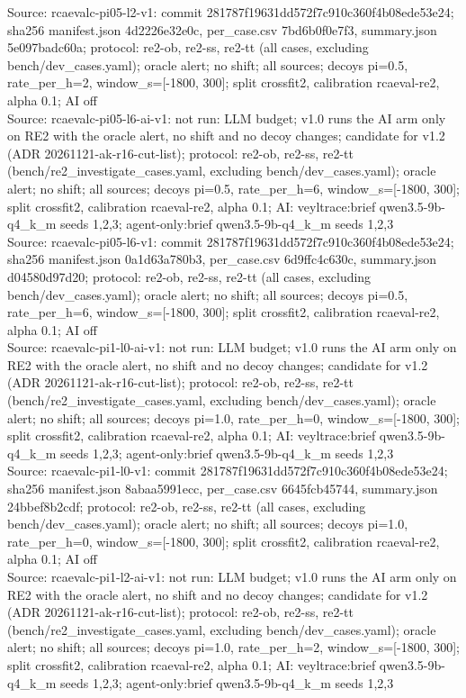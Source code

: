 \begin{table}[t]
Source: rcaevalc-pi05-l2-v1: commit 281787f19631dd572f7c910c360f4b08ede53e24; sha256 manifest.json 4d2226e32e0c, per\_case.csv 7bd6b0f0e7f3, summary.json 5e097badc60a; protocol: re2-ob, re2-ss, re2-tt (all cases, excluding bench/dev\_cases.yaml); oracle alert; no shift; all sources; decoys pi=0.5, rate\_per\_h=2, window\_s=[-1800, 300]; split crossfit2, calibration rcaeval-re2, alpha 0.1; AI off\\
Source: rcaevalc-pi05-l6-ai-v1: not run: LLM budget; v1.0 runs the AI arm only on RE2 with the oracle alert, no shift and no decoy changes; candidate for v1.2 (ADR 20261121-ak-r16-cut-list); protocol: re2-ob, re2-ss, re2-tt (bench/re2\_investigate\_cases.yaml, excluding bench/dev\_cases.yaml); oracle alert; no shift; all sources; decoys pi=0.5, rate\_per\_h=6, window\_s=[-1800, 300]; split crossfit2, calibration rcaeval-re2, alpha 0.1; AI: veyltrace:brief qwen3.5-9b-q4\_k\_m seeds 1,2,3; agent-only:brief qwen3.5-9b-q4\_k\_m seeds 1,2,3\\
Source: rcaevalc-pi05-l6-v1: commit 281787f19631dd572f7c910c360f4b08ede53e24; sha256 manifest.json 0a1d63a780b3, per\_case.csv 6d9ffc4c630c, summary.json d04580d97d20; protocol: re2-ob, re2-ss, re2-tt (all cases, excluding bench/dev\_cases.yaml); oracle alert; no shift; all sources; decoys pi=0.5, rate\_per\_h=6, window\_s=[-1800, 300]; split crossfit2, calibration rcaeval-re2, alpha 0.1; AI off\\
Source: rcaevalc-pi1-l0-ai-v1: not run: LLM budget; v1.0 runs the AI arm only on RE2 with the oracle alert, no shift and no decoy changes; candidate for v1.2 (ADR 20261121-ak-r16-cut-list); protocol: re2-ob, re2-ss, re2-tt (bench/re2\_investigate\_cases.yaml, excluding bench/dev\_cases.yaml); oracle alert; no shift; all sources; decoys pi=1.0, rate\_per\_h=0, window\_s=[-1800, 300]; split crossfit2, calibration rcaeval-re2, alpha 0.1; AI: veyltrace:brief qwen3.5-9b-q4\_k\_m seeds 1,2,3; agent-only:brief qwen3.5-9b-q4\_k\_m seeds 1,2,3\\
Source: rcaevalc-pi1-l0-v1: commit 281787f19631dd572f7c910c360f4b08ede53e24; sha256 manifest.json 8abaa5991ecc, per\_case.csv 6645fcb45744, summary.json 24bbef8b2cdf; protocol: re2-ob, re2-ss, re2-tt (all cases, excluding bench/dev\_cases.yaml); oracle alert; no shift; all sources; decoys pi=1.0, rate\_per\_h=0, window\_s=[-1800, 300]; split crossfit2, calibration rcaeval-re2, alpha 0.1; AI off\\
Source: rcaevalc-pi1-l2-ai-v1: not run: LLM budget; v1.0 runs the AI arm only on RE2 with the oracle alert, no shift and no decoy changes; candidate for v1.2 (ADR 20261121-ak-r16-cut-list); protocol: re2-ob, re2-ss, re2-tt (bench/re2\_investigate\_cases.yaml, excluding bench/dev\_cases.yaml); oracle alert; no shift; all sources; decoys pi=1.0, rate\_per\_h=2, window\_s=[-1800, 300]; split crossfit2, calibration rcaeval-re2, alpha 0.1; AI: veyltrace:brief qwen3.5-9b-q4\_k\_m seeds 1,2,3; agent-only:brief qwen3.5-9b-q4\_k\_m seeds 1,2,3\\

\end{table}

